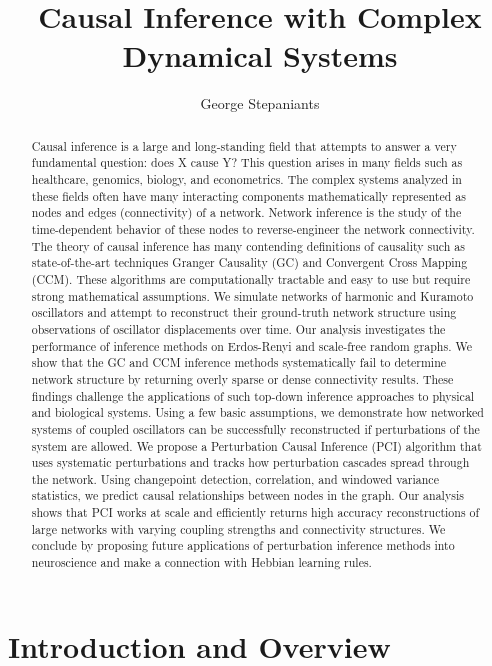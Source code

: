 \documentclass[]{article}
\title{Causal Inference with Complex Dynamical Systems}
\author{George Stepaniants}
\begin{document}
\maketitle
\begin{abstract}
Causal inference is a large and long-standing field that attempts to answer a very fundamental question: does X cause Y? This question arises in many fields such as healthcare, genomics, biology, and econometrics. The complex systems analyzed in these fields often have many interacting components mathematically represented as nodes and edges (connectivity) of a network. Network inference is the study of the time-dependent behavior of these nodes to reverse-engineer the network connectivity. The theory of causal inference has many contending definitions of causality such as state-of-the-art techniques Granger Causality (GC) and Convergent Cross Mapping (CCM). These algorithms are computationally tractable and easy to use but require strong mathematical assumptions. We simulate networks of harmonic and Kuramoto oscillators and attempt to reconstruct their ground-truth network structure using observations of oscillator displacements over time. Our analysis investigates the performance of inference methods on Erdos-Renyi and scale-free random graphs. We show that the GC and CCM inference methods systematically fail to determine network structure by returning overly sparse or dense connectivity results. These findings challenge the applications of such top-down inference approaches to physical and biological systems. Using a few basic assumptions, we demonstrate how networked systems of coupled oscillators can be successfully reconstructed if perturbations of the system are allowed. We propose a Perturbation Causal Inference (PCI) algorithm that uses systematic perturbations and tracks how perturbation cascades spread through the network. Using changepoint detection, correlation, and windowed variance statistics, we predict causal relationships between nodes in the graph. Our analysis shows that PCI works at scale and efficiently returns high accuracy reconstructions of large networks with varying coupling strengths and connectivity structures. We conclude by proposing future applications of perturbation inference methods into neuroscience and make a connection with Hebbian learning rules.
\end{abstract}

\section{Introduction and Overview}
\end{document}
